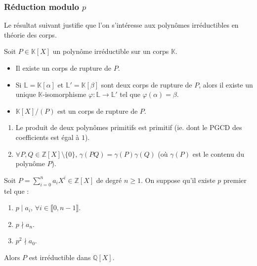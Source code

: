   \subsubsection{Réduction modulo \texorpdfstring{$p$}{p}}

  Le résultat suivant justifie que l'on s'intéresse aux polynômes irréductibles en théorie des corps.


  \begin{theorem}
    Soit $P \in \mathbb{K}[X]$ un polynôme irréductible sur un corps $\mathbb{K}$.
    \begin{itemize}
      \item Il existe un corps de rupture de $P$.
      \item Si $\mathbb{L} = \mathbb{K}[\alpha]$ et $\mathbb{L}' = \mathbb{K}[\beta]$ sont deux corps de rupture de $P$, alors il existe un unique $\mathbb{K}$-isomorphisme $\varphi : \mathbb{L} \rightarrow \mathbb{L}'$ tel que $\varphi(\alpha) = \beta$.
      \item $\mathbb{K}[X]/(P)$ est un corps de rupture de $P$.
    \end{itemize}
  \end{theorem}


  \begin{lemma}[Gauss]
    \begin{enumerate}[label=(\roman*)]
      \item Le produit de deux polynômes primitifs est primitif (ie. dont le PGCD des coefficients est égal à $1$).
      \item $\forall P, Q \in \mathbb{Z}[X] \setminus \{ 0 \}$, $\gamma(PQ) = \gamma(P) \gamma(Q)$ (où $\gamma(P)$ est le contenu du polynôme $P$).
    \end{enumerate}
  \end{lemma}


  \begin{theorem}
    Soit $P = \sum_{i=0}^n a_i X^i \in \mathbb{Z}[X]$ de degré $n \geq 1$. On suppose qu'il existe $p$ premier tel que :
    \begin{enumerate}[label=(\roman*)]
      \item $p \mid a_i$, $\forall i \in \llbracket 0, n-1 \rrbracket$.
      \item $p \nmid a_n$.
      \item $p^2 \nmid a_0$.
    \end{enumerate}
    Alors $P$ est irréductible dans $\mathbb{Q}[X]$.
  \end{theorem}

